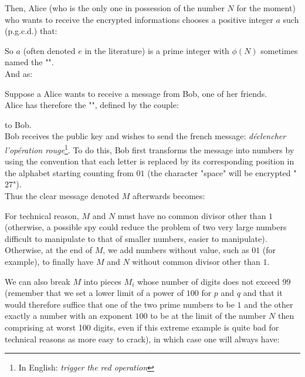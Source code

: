 	\begin{tcolorbox}[colframe=black,colback=white,sharp corners]
	Then, Alice (who is the only one in possession of the number $N$ for the moment) who wants to receive the encrypted informations chooses a positive integer $a$ such (p.g.c.d.) that:
	
	So $a$ (often denoted $e$ in the literature) is a prime integer with $\phi(N)$ sometimes named the "".\\
	
	And as:
	
	Suppose a Alice wants to receive a message from Bob, one of her friends.\\

	Alice has therefore the "", defined by the couple:
	
	to Bob.\\
	
	Bob receives the public key and wishes to send the french message: \textit{déclencher l'opération rouge}\footnote{In English: \textit{trigger the red operation}}. To do this, Bob first transforms the message into numbers by using the convention that each letter is replaced by its corresponding position in the alphabet starting counting from $01$ (the character "space" will be encrypted "$27$").\\

	Thus the clear message denoted $M$ afterwards becomes:
	
	\begin{tcolorbox}[title=Remark,colframe=black,arc=10pt]
	For technical reason, $M$ and $N$ must have no common divisor other than $1$ (otherwise, a possible spy could reduce the problem of two very large numbers difficult to manipulate to that of smaller numbers, easier to manipulate). Otherwise, at the end of $M$, we add numbers without value, such as $01$ (for example), to finally have $M$ and $N$ without common divisor other than $1$.
	\end{tcolorbox}
	We can also break $M$ into pieces $M_i$ whose number of digits does not exceed $99$ (remember that we set a lower limit of a power of $100$ for $p$ and $q$ and that it would therefore suffice that one of the two prime numbers to be $1$ and the other exactly a number with an exponent $100$ to be at the limit of the number $N$ then comprising at worst 100 digits, even if this extreme example is quite bad for technical reasons as more easy to crack), in which case one will always have:
	
	\end{tcolorbox}
	

